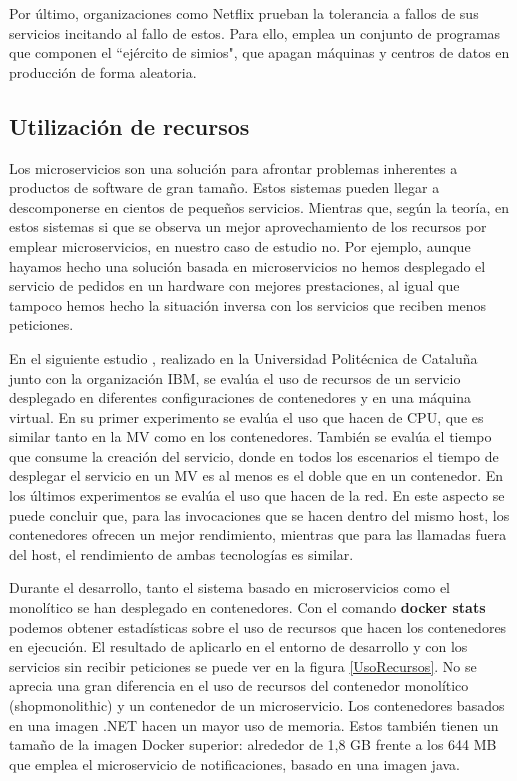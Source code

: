 \documentclass[11pt,spanish,listoffigures]{tfgetsinf}
\begin{document}
Por último, organizaciones como Netflix prueban la tolerancia a fallos de sus servicios incitando al fallo de estos. Para ello, emplea un conjunto de programas que componen el ``ejército de simios", que apagan máquinas y centros de datos en producción de forma aleatoria. \cite{Lewis2014}

\subsection{Utilización de recursos}

Los microservicios son una solución para afrontar problemas inherentes a productos de software de gran tamaño. Estos sistemas pueden llegar a descomponerse en cientos de pequeños servicios. Mientras que, según la teoría, en estos sistemas si que se observa un mejor aprovechamiento de los recursos por emplear microservicios, \cite{DelaTorre2018} en nuestro caso de estudio no. Por ejemplo, aunque hayamos hecho una solución basada en microservicios no hemos desplegado el servicio de pedidos en un hardware con mejores prestaciones, al igual que tampoco hemos hecho la situación inversa con los servicios que reciben menos peticiones.

En el siguiente estudio \cite{Amaral2016}, realizado en la Universidad Politécnica de Cataluña junto con la organización IBM, se evalúa el uso de recursos de un servicio desplegado en diferentes configuraciones de contenedores y en una máquina virtual. En su primer experimento se evalúa el uso que hacen de CPU, que es similar tanto en la MV como en los contenedores. También se evalúa el tiempo que consume la creación del servicio, donde en todos los escenarios el tiempo de desplegar el servicio en un MV es al menos es el doble que en un contenedor. En los últimos experimentos se evalúa el uso que hacen de la red. En este aspecto se puede concluir que, para las invocaciones que se hacen dentro del mismo host, los contenedores ofrecen un mejor rendimiento, mientras que para las llamadas fuera del host, el rendimiento de ambas tecnologías es similar.

Durante el desarrollo, tanto el sistema basado en microservicios como el monolítico se han desplegado en contenedores. Con el comando \textbf{docker stats} podemos obtener estadísticas sobre el uso de recursos que hacen los contenedores en ejecución. El resultado de aplicarlo en el entorno de desarrollo y con los servicios sin recibir peticiones se puede ver en la figura \ref{UsoRecursos}. No se aprecia una gran diferencia en el uso de recursos del contenedor monolítico (shopmonolithic) y un contenedor de un microservicio. Los contenedores basados en una imagen .NET hacen un mayor uso de memoria. Estos también tienen un tamaño de la imagen Docker superior: alrededor de 1,8 GB frente a los 644 MB que emplea el microservicio de notificaciones, basado en una imagen java.
\end{document}
